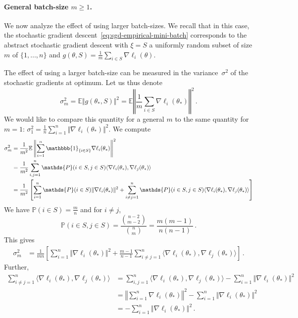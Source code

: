 \documentclass[11pt,reqno]{article}
\newcommand{\E}{\mathbb{E}}
\renewcommand{\P}{\mathds{P}}
\renewcommand{\P}{\mathds{P}}
\renewcommand{\geq}{\geqslant}
\numberwithin{equation}{section}
\theoremstyle{plain}
\theoremstyle{definition}
\theoremstyle{remark}
\begin{document}
\paragraph{General batch-size $m \geq 1$.} We now analyze the effect of using larger batch-sizes. We recall that in this case, the stochastic gradient descent~\eqref{eq:sgd-empirical-mini-batch} corresponds to the abstract stochastic gradient descent with $\xi = S$ a uniformly random subset of size $m$ of $\{1,\dots,n\}$ and $g(\theta,S) = \frac{1}{m} \sum_{i\in S} \nabla \ell_i(\theta)$. 

The effect of using a larger batch-size can be measured in the variance~$\sigma^2$ of the stochastic gradients at optimum. Let us thus denote 
\begin{equation*}
	\sigma^2_m = \E \Vert g(\theta_*, S) \Vert^2 = \E \left\Vert  \frac{1}{m} \sum_{i\in S} \nabla \ell_i(\theta_*) \right\Vert^2 \, .
\end{equation*}
We would like to compare this quantity for a general $m$ to the same quantity for $m=1$: $\sigma_1^2 = \frac{1}{n}\sum_{i=1}^{n} \Vert \nabla \ell_i(\theta_*) \Vert^2$. We compute 
\begin{align*}
	\sigma^2_m &= \frac{1}{m^2} \E \left\Vert \sum_{i=1}^{n} \mathbbb{1}_{\{i \in S\}} \nabla\ell_i(\theta_*) \right\Vert^2 \\
	&= \frac{1}{m^2} \sum_{i,j=1}^{n} \P(i\in S, j \in S) \langle \nabla\ell_i(\theta_*), \nabla\ell_j(\theta_*) \rangle \\
	&= \frac{1}{m^2} \left[\sum_{i=1}^{n} \P(i\in S) \Vert \nabla \ell_i(\theta_*) \Vert^2 + \sum_{i \neq j=1}^{n} \P(i\in S, j \in S) \langle \nabla\ell_i(\theta_*), \nabla\ell_j(\theta_*) \rangle\right]
\end{align*}
We have $\P(i\in S) = \frac{m}{n}$ and for $i \neq j$, 
\begin{equation*}
	\P(i\in S, j \in S) = \frac{{n-2 \choose m-2}}{{n \choose m}} = \frac{m(m-1)}{n(n-1)} \, .
\end{equation*}
This gives
\begin{align*}
	\sigma^2_m &= \frac{1}{mn} \left[\sum_{i=1}^{n} \Vert \nabla \ell_i(\theta_*) \Vert^2 + \frac{m-1}{n-1}\sum_{i \neq j=1}^{n}  \langle \nabla\ell_i(\theta_*), \nabla\ell_j(\theta_*) \rangle\right] \, .
\end{align*}
Further, 
\begin{align*}
	\sum_{i \neq j=1}^{n}  \langle \nabla\ell_i(\theta_*), \nabla\ell_j(\theta_*) \rangle &= \sum_{i, j=1}^{n}  \langle \nabla\ell_i(\theta_*), \nabla\ell_j(\theta_*) \rangle - \sum_{i=1}^{n} \Vert \nabla \ell_i(\theta_*) \Vert^2 \\
	&= \left\Vert \sum_{i=1}^{n} \nabla\ell_i(\theta_*) \right\Vert^2 - \sum_{i=1}^{n} \Vert \nabla \ell_i(\theta_*) \Vert^2 \\
	&= - \sum_{i=1}^{n} \Vert \nabla \ell_i(\theta_*) \Vert^2 \, .
\end{align*}
\end{document}
